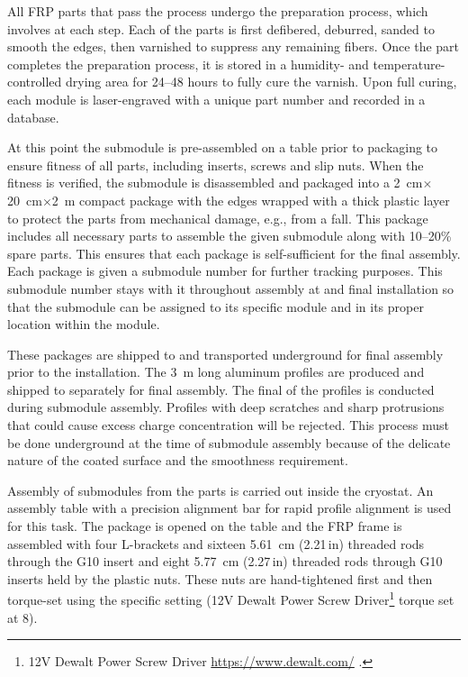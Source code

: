 All FRP parts that pass the   process undergo the preparation process, which involves  at each step.  Each of the parts is first defibered, deburred, sanded to smooth the edges, then varnished to
suppress any remaining fibers.  Once the part completes the preparation process, it is stored in a humidity- and temperature-controlled drying area for \numrange{24}{48} hours to fully cure the varnish.  Upon full curing, each module is laser-engraved with a unique part number and recorded in a   database. 

At this point the submodule is pre-assembled on a table prior to packaging to ensure fitness of all parts, including inserts, screws and slip nuts.   When the fitness is verified, the submodule is disassembled and packaged into a \SI{2}{\cm}$\times$\SI{20}{\cm}$\times$\SI{2}{\m} compact package with the edges wrapped with a thick plastic layer to protect the parts from mechanical damage, e.g., from a fall.  This package includes all necessary parts to assemble the given submodule 
along with \numrange{10}{20}\% spare parts.  This ensures that each package is self-sufficient for the final assembly.  Each package is given a submodule number for further tracking purposes.  This submodule number stays with it throughout assembly at \surf and final installation so that the submodule can be assigned to its specific module and in its proper location within the module. 

These packages are shipped to \surf and transported underground 
for final assembly prior to the installation.   
The \SI{3}{\m} long aluminum profiles are produced and shipped to \surf separately for final assembly.  The final  of the profiles is conducted during submodule assembly.   Profiles with deep scratches and sharp protrusions that could cause excess charge concentration will be rejected. This process must be done underground at the time of submodule assembly because of the delicate nature of the coated surface and the smoothness requirement. 

Assembly of submodules from the parts is carried out inside the cryostat.   An assembly table with a precision alignment bar for rapid profile alignment is used for this task.   The package is opened on the table and the FRP frame is assembled with four L-brackets and sixteen \SI{5.61}{\cm} (\num{2.21}\,in) threaded rods through the G10 insert and eight \SI{5.77}{\cm} (\num{2.27}\,in) threaded rods through G10 inserts held by the plastic nuts.  These nuts are hand-tightened first and then torque-set using the specific setting (12V Dewalt Power Screw Driver\footnote{12V Dewalt\texttrademark{} Power Screw Driver \url{https://www.dewalt.com/} .} torque set at 8).

